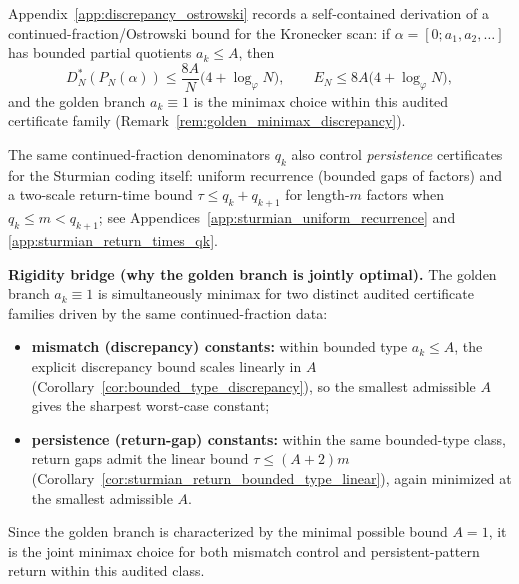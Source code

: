 \begin{remark}
\label{rem:bounded_type_certificate}
Appendix~\ref{app:discrepancy_ostrowski} records a self-contained derivation of a
continued-fraction/Ostrowski bound for the Kronecker scan:
if $\alpha=[0;a_1,a_2,\ldots]$ has bounded partial quotients $a_k\le A$, then
\[
D_N^\ast(P_N(\alpha))\le \frac{8A}{N}\bigl(4+\log_\varphi N\bigr),
\qquad
E_N\le 8A\bigl(4+\log_\varphi N\bigr),
\]
and the golden branch $a_k\equiv 1$ is the minimax choice within this audited
certificate family (Remark~\ref{rem:golden_minimax_discrepancy}).
\par
\AuditTag The same continued-fraction denominators $q_k$ also control \emph{persistence} certificates for the Sturmian coding itself:
uniform recurrence (bounded gaps of factors) and a two-scale return-time bound $\tau\le q_k+q_{k+1}$ for length-$m$ factors when $q_k\le m<q_{k+1}$; see Appendices~\ref{app:sturmian_uniform_recurrence} and \ref{app:sturmian_return_times_qk}.
\par
\AuditTag \textbf{Rigidity bridge (why the golden branch is jointly optimal).}
The golden branch $a_k\equiv 1$ is simultaneously minimax for two distinct audited certificate families driven by the same continued-fraction data:
\begin{itemize}
\item \textbf{mismatch (discrepancy) constants:} within bounded type $a_k\le A$, the explicit discrepancy bound scales linearly in $A$ (Corollary~\ref{cor:bounded_type_discrepancy}), so the smallest admissible $A$ gives the sharpest worst-case constant;
\item \textbf{persistence (return-gap) constants:} within the same bounded-type class, return gaps admit the linear bound $\tau\le (A+2)m$ (Corollary~\ref{cor:sturmian_return_bounded_type_linear}), again minimized at the smallest admissible $A$.
\end{itemize}
Since the golden branch is characterized by the minimal possible bound $A=1$, it is the joint minimax choice for both mismatch control and persistent-pattern return within this audited class.
\end{remark}

